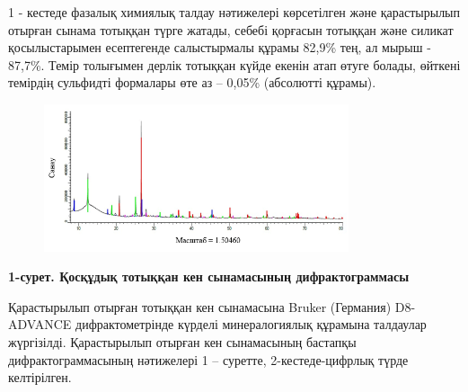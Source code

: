 {%

1 - кестеде фазалық химиялық талдау нәтижелері көрсетілген және
қарастырылып отырған сынама тотыққан түрге жатады, себебі қорғасын
тотыққан және силикат қосылыстарымен есептегенде салыстырмалы құрамы
82,9\% тең, ал мырыш - 87,7\%. Темір толығымен дерлік тотыққан күйде
екенін атап өтуге болады, өйткені темірдің сульфидті формалары өте аз --
0,05\% (абсолютті құрамы).

\begin{figure}[H]
	\centering
	\includegraphics[width=0.8\textwidth]{media/gorn/image6}
	\caption*{}
\end{figure}


{\bfseries 1-сурет. Қосқұдық тотыққан кен сынамасының дифрактограммасы}

Қарастырылып отырған тотыққан кен сынамасына Bruker (Германия)
D8-ADVANCE дифрактометрінде күрделі минералогиялық құрамына талдаулар
жүргізілді. Қарастырылып отырған кен сынамасының бастапқы
дифрактограммасының нәтижелері 1 -- суретте, 2-кестеде-цифрлық түрде
келтірілген.

}
